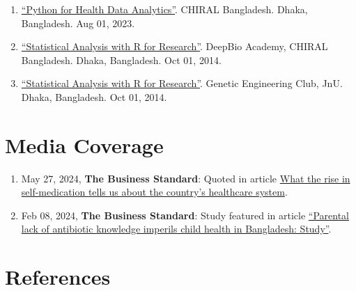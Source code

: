 \documentclass[
  11pt,
  letterpaper,
  DIV=11,
  numbers=noendperiod]{scrartcl}
\providecommand{\tightlist}{%
  \setlength{\itemsep}{0pt}\setlength{\parskip}{0pt}}
\begin{document}
\begin{enumerate}
{  Bioinformatics''}. CHIRAL Bangladesh. Dhaka, Bangladesh. Aug 01, 2023.
\item
  \href{https://www.youtube.com/playlist?list=PLQtDkvtE4BUYqRQa6Lev4NFg5MJ4fuKsw}{``Python
  for Health Data Analytics''}. CHIRAL Bangladesh. Dhaka, Bangladesh.
  Aug 01, 2023.
\item
  \href{https://mdjubayerhossain.com/SAR/}{``Statistical Analysis with R
  for Research''}. DeepBio Academy, CHIRAL Bangladesh. Dhaka,
  Bangladesh. Oct 01, 2014.
\item
  \href{https://mdjubayerhossain.com/SAR/}{``Statistical Analysis with R
  for Research''}. Genetic Engineering Club, JnU. Dhaka, Bangladesh. Oct
  01, 2014.
\end{enumerate}

\section{Media Coverage}\label{media-coverage}

\apptocmd{\tightlist}{\setlength{\itemsep}{2pt}}{}{}

\begin{enumerate}
\def\labelenumi{\arabic{enumi}.}
\tightlist
\item
  May 27, 2024, \textbf{The Business Standard}: Quoted in article
  \href{https://www.tbsnews.net/features/panorama/what-rise-self-medication-tells-us-about-countrys-healthcare-system-861146}{What
  the rise in self-medication tells us about the country's healthcare
  system}.
\item
  Feb 08, 2024, \textbf{The Business Standard}: Study featured in
  article
  \href{https://www.tbsnews.net/bangladesh/health/parental-lack-antibiotic-knowledge-imperils-child-health-bangladesh-study-789250}{``Parental
  lack of antibiotic knowledge imperils child health in Bangladesh:
  Study''}.
\end{enumerate}

\section{References}\label{references}

\noindent
\end{document}
